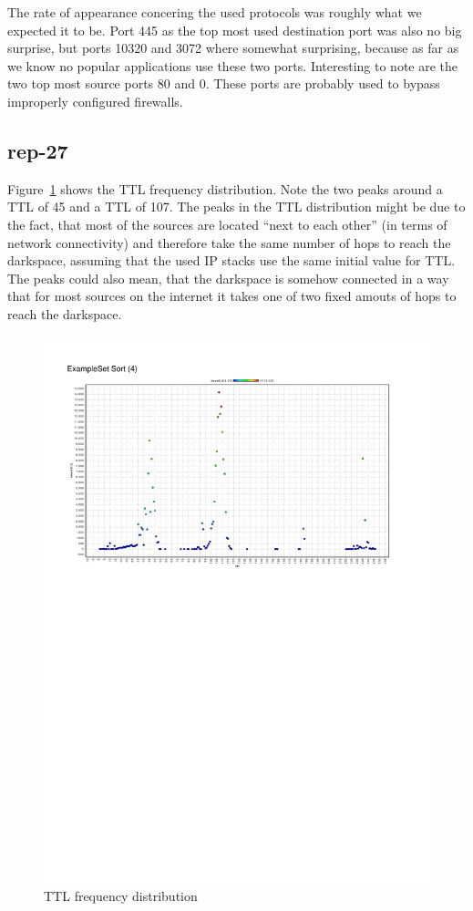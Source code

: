 \documentclass{article}
\begin{document}
The rate of appearance concering the used protocols was roughly what we expected it to be. Port
445 as the top most used destination port was also no big surprise, but ports 10320 and 3072 where
somewhat surprising, because as far as we know no popular applications use these two ports.
Interesting to note are the two top most source ports 80 and 0. These ports are probably used to
bypass improperly configured firewalls.

\subsection{rep-27}

Figure~\ref{figure:rep-27} shows the TTL frequency distribution. Note the two peaks around a
TTL of 45 and a TTL of 107.
The peaks in the TTL distribution might be due to the fact, that most of the sources are located ``next
to each other'' (in terms of network connectivity) and therefore take the same number of hops to reach
the darkspace, assuming that the used IP stacks use the same initial value for TTL.
The peaks could also mean, that the darkspace is somehow connected in a way that for most sources 
on the internet it takes one of two fixed amouts of hops to reach the darkspace.

\begin{figure}[h]
    \centering
    \includegraphics[clip, trim=1cm 17cm 2cm 2cm, width=1.00\textwidth]{../exercise-4/ttl.pdf}
    \caption{\label{figure:rep-27} TTL frequency distribution}
\end{figure}
\end{document}

